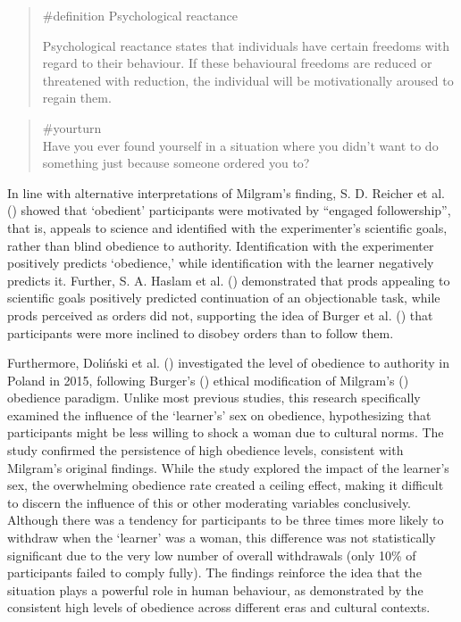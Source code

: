 \documentclass[
  letterpaper,
]{book}
\begin{document}
\begin{quote}
\label{def-psychologicalreactance}{\#definition}
Psychological reactance

Psychological reactance states that individuals have certain freedoms
with regard to their behaviour. If these behavioural freedoms are
reduced or threatened with reduction, the individual will be
motivationally aroused to regain them.
\end{quote}

\begin{quote}
{\#yourturn}\\
Have you ever found yourself in a situation where you didn't want to do
something just because someone ordered you to?
\end{quote}

In line with alternative interpretations of Milgram's finding, S. D.
Reicher et al. () showed that
`obedient' participants were motivated by ``engaged followership'', that
is, appeals to science and identified with the experimenter's scientific
goals, rather than blind obedience to authority. Identification with the
experimenter positively predicts `obedience,' while identification with
the learner negatively predicts it. Further, S. A. Haslam et al.
() demonstrated that prods
appealing to scientific goals positively predicted continuation of an
objectionable task, while prods perceived as orders did not, supporting
the idea of Burger et al. () that
participants were more inclined to disobey orders than to follow them.

Furthermore, Doliński et al. ()
investigated the level of obedience to authority in Poland in 2015,
following Burger's ()
ethical modification of Milgram's
() obedience paradigm.
Unlike most previous studies, this research specifically examined the
influence of the `learner's' sex on obedience, hypothesizing that
participants might be less willing to shock a woman due to cultural
norms. The study confirmed the persistence of high obedience levels,
consistent with Milgram's original findings. While the study explored
the impact of the learner's sex, the overwhelming obedience rate created
a ceiling effect, making it difficult to discern the influence of this
or other moderating variables conclusively. Although there was a
tendency for participants to be three times more likely to withdraw when
the `learner' was a woman, this difference was not statistically
significant due to the very low number of overall withdrawals (only 10\%
of participants failed to comply fully). The findings reinforce the idea
that the situation plays a powerful role in human behaviour, as
demonstrated by the consistent high levels of obedience across different
eras and cultural contexts.
\end{document}

